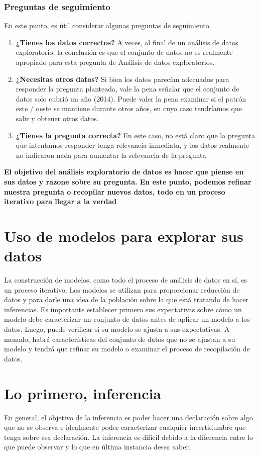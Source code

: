 \documentclass[10pt]{book}
\begin{document}
        \subsection{Preguntas de seguimiento}
        En este punto, es útil considerar algunas preguntas de seguimiento.
        \begin{enumerate}[ \bfseries 1.]
            \item \textbf{¿Tienes los datos correctos?} A veces, al final de un análisis de datos exploratorio, la conclusión es que el conjunto de datos no es realmente apropiado para esta pregunta de Análisis de datos exploratorios.
            \item \textbf{¿Necesitas otros datos?} Si bien los datos parecían adecuados para responder la pregunta planteada, vale la pena señalar que el conjunto de datos solo cubrió un año (2014). Puede valer la pena examinar si el patrón este / oeste se mantiene durante otros años, en cuyo caso tendríamos que salir y obtener otros datos.
            \item \textbf{¿Tienes la pregunta correcta?} En este caso, no está claro que la pregunta que intentamos responder tenga relevancia inmediata, y los datos realmente no indicaron nada para aumentar la relevancia de la pregunta.
        \end{enumerate}
        \textbf{El objetivo del análisis exploratorio de datos es hacer que piense en sus datos y razone sobre su pregunta. En este punto, podemos refinar nuestra pregunta o recopilar nuevos datos, todo en un proceso iterativo para llegar a la verdad}

\chapter{Uso de modelos para explorar sus datos}
La construcción de modelos, como todo el proceso de análisis de datos en sí, es un proceso iterativo. Los modelos se utilizan para proporcionar reducción de datos y para darle una idea de la población sobre la que está tratando de hacer inferencias. Es importante establecer primero sus expectativas sobre cómo un modelo debe caracterizar un conjunto de datos antes de aplicar un modelo a los datos. Luego, puede verificar si su modelo se ajusta a sus expectativas. A menudo, habrá características del conjunto de datos que no se ajustan a su modelo y tendrá que refinar su modelo o examinar el proceso de recopilación de datos.
 
\chapter{Lo primero, inferencia}
En general, el objetivo de la inferencia es poder hacer una declaración sobre algo que no se observa e idealmente poder caracterizar cualquier incertidumbre que tenga sobre esa declaración. La inferencia es difícil debido a la diferencia entre lo que puede observar y lo que en última instancia desea saber.
\end{document}
